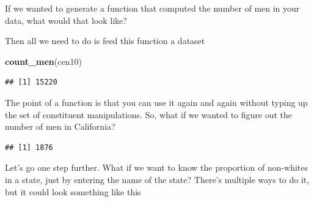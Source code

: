 \documentclass[]{book}
\newenvironment{Shaded}{\begin{snugshade}}{\end{snugshade}}
\newcommand{\KeywordTok}[1]{\textcolor[rgb]{0.13,0.29,0.53}{\textbf{#1}}}
\newcommand{\StringTok}[1]{\textcolor[rgb]{0.31,0.60,0.02}{#1}}
\newcommand{\ControlFlowTok}[1]{\textcolor[rgb]{0.13,0.29,0.53}{\textbf{#1}}}
\newcommand{\OperatorTok}[1]{\textcolor[rgb]{0.81,0.36,0.00}{\textbf{#1}}}
\newcommand{\NormalTok}[1]{#1}
\theoremstyle{definition}
\theoremstyle{definition}
\theoremstyle{definition}
\theoremstyle{remark}
\begin{document}
If we wanted to generate a function that computed the number of men in
your data, what would that look like?

\begin{Shaded}
\end{Shaded}

Then all we need to do is feed this function a dataset

\begin{Shaded}
\begin{Highlighting}[]
\KeywordTok{count_men}\NormalTok{(cen10)}
\end{Highlighting}
\end{Shaded}

\begin{verbatim}
## [1] 15220
\end{verbatim}

The point of a function is that you can use it again and again without
typing up the set of constituent manipulations. So, what if we wanted to
figure out the number of men in California?

\begin{Shaded}
\end{Shaded}

\begin{verbatim}
## [1] 1876
\end{verbatim}

Let's go one step further. What if we want to know the proportion of
non-whites in a state, just by entering the name of the state? There's
multiple ways to do it, but it could look something like this

\begin{Shaded}
\end{Shaded}
\end{document}
